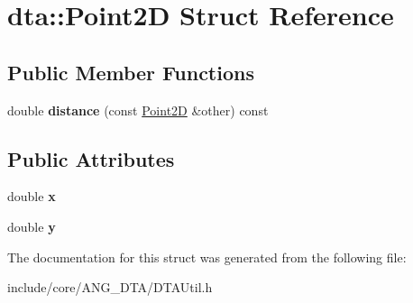 \hypertarget{structdta_1_1Point2D}{}\section{dta\+:\+:Point2D Struct Reference}
\label{structdta_1_1Point2D}
\subsection*{Public Member Functions}
\begin{DoxyCompactItemize}
\item 
double {\bfseries distance} (const \hyperlink{structdta_1_1Point2D}{Point2D} \&other) const \hypertarget{structdta_1_1Point2D_a26c33381f7f7fc342ed4f6a80fb036dc}{}\label{structdta_1_1Point2D_a26c33381f7f7fc342ed4f6a80fb036dc}

\end{DoxyCompactItemize}
\subsection*{Public Attributes}
\begin{DoxyCompactItemize}
\item 
double {\bfseries x}\hypertarget{structdta_1_1Point2D_a579605c547c5054b95278a2c67219fb2}{}\label{structdta_1_1Point2D_a579605c547c5054b95278a2c67219fb2}

\item 
double {\bfseries y}\hypertarget{structdta_1_1Point2D_a502713d78fba0ef4d0b7e506558c1218}{}\label{structdta_1_1Point2D_a502713d78fba0ef4d0b7e506558c1218}

\end{DoxyCompactItemize}


The documentation for this struct was generated from the following file\+:\begin{DoxyCompactItemize}
\item 
include/core/\+A\+N\+G\+\_\+\+D\+T\+A/D\+T\+A\+Util.\+h\end{DoxyCompactItemize}
